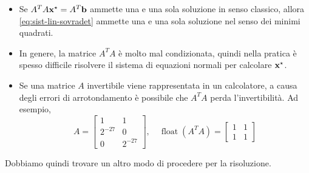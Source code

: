 \begin{itemize}
    \item Se $A^{T} A\mathbf{x}^{\star } =A^{T}\mathbf{b}$ ammette una e una sola soluzione in senso classico, allora \eqref{eq:sist-lin-sovradet} ammette una e una sola soluzione nel senso dei minimi quadrati.
    \item In genere, la matrice $A^{T} A$ è molto mal condizionata, quindi nella pratica è spesso difficile risolvere il sistema di equazioni normali per calcolare $\mathbf{x}^{\star }$.
    \item Se una matrice $A$ invertibile viene rappresentata in un calcolatore, a causa degli errori di arrotondamento è possibile che $A^TA$ perda l'invertibilità. Ad esempio,
    \[
        A = \begin{bmatrix}
            1 & 1 \\
            2^{-27} & 0 \\
            0 & 2^{-27}
        \end{bmatrix},\quad \operatorname{float}(A^T A)=\begin{bmatrix}
            1 & 1\\
            1 & 1
        \end{bmatrix}
    \]
\end{itemize}
Dobbiamo quindi trovare un altro modo di procedere per la risoluzione.
